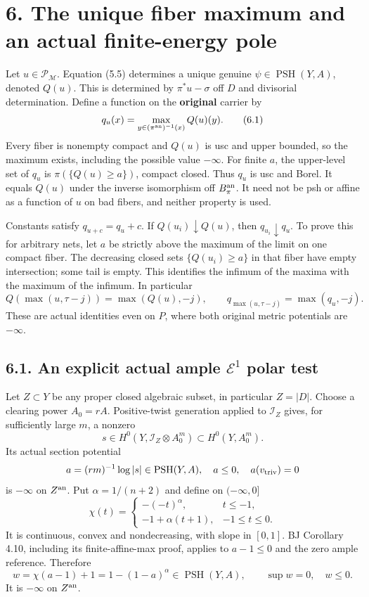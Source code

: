 \documentclass[
  10pt,
]{article}
\begin{document}
\section{6. The unique fiber maximum and an actual finite-energy
pole}\label{the-unique-fiber-maximum-and-an-actual-finite-energy-pole}

Let \(u\in\mathcal P_{\mathcal M}\). Equation (5.5) determines a unique
genuine \(\psi\in\operatorname{PSH}(Y,A)\), denoted \(Q(u)\). This is
determined by \(\pi^*u-\sigma\) off \(D\) and divisorial determination.
Define a function on the \textbf{original} carrier by \[
 q_u(x)=\max_{y\in(\pi^{\rm an})^{-1}(x)}Q(u)(y).
 \tag{6.1}
\] Every fiber is nonempty compact and \(Q(u)\) is usc and upper
bounded, so the maximum exists, including the possible value
\(-\infty\). For finite \(a\), the upper-level set of \(q_u\) is
\(\pi(\{Q(u)\geq a\})\), compact closed. Thus \(q_u\) is usc and Borel.
It equals \(Q(u)\) under the inverse isomorphism off \(B_\pi^{\rm an}\).
It need not be psh or affine as a function of \(u\) on bad fibers, and
neither property is used.

Constants satisfy \(q_{u+c}=q_u+c\). If \(Q(u_i)\downarrow Q(u)\), then
\(q_{u_i}\downarrow q_u\). To prove this for arbitrary nets, let \(a\)
be strictly above the maximum of the limit on one compact fiber. The
decreasing closed sets \(\{Q(u_i)\geq a\}\) in that fiber have empty
intersection; some tail is empty. This identifies the infimum of the
maxima with the maximum of the infimum. In particular \[
 Q(\max(u,\tau-j))=\max(Q(u),-j),\qquad
 q_{\max(u,\tau-j)}=\max(q_u,-j).
 \tag{6.2}
\] These are actual identities even on \(P\), where both original metric
potentials are \(-\infty\).

\subsection{\texorpdfstring{6.1. An explicit actual ample
\(\mathcal E^1\) polar
test}{6.1. An explicit actual ample \textbackslash mathcal E\^{}1 polar test}}\label{an-explicit-actual-ample-mathcal-e1-polar-test}

Let \(Z\subset Y\) be any proper closed algebraic subset, in particular
\(Z=|D|\). Choose a clearing power \(A_0=rA\). Positive-twist generation
applied to \(\mathcal I_Z\) gives, for sufficiently large \(m\), a
nonzero \[
 s\in H^0(Y,\mathcal I_Z\otimes A_0^m)\subset H^0(Y,A_0^m).
\] Its actual section potential \[
 a=(rm)^{-1}\log|s|\in\operatorname{PSH}(Y,A),\quad a\leq0,\quad
 a(v_{\rm triv})=0
\] is \(-\infty\) on \(Z^{\rm an}\). Put \(\alpha=1/(n+2)\) and define
on \((-\infty,0]\) \[
 \chi(t)=
 \begin{cases}
 -(-t)^\alpha,&t\leq-1,\\
 -1+\alpha(t+1),&-1\leq t\leq0.
 \end{cases}
\] It is continuous, convex and nondecreasing, with slope in \([0,1]\).
BJ Corollary 4.10, including its finite-affine-max proof, applies to
\(a-1\leq0\) and the zero ample reference. Therefore \[
 w=\chi(a-1)+1=1-(1-a)^\alpha
 \in\operatorname{PSH}(Y,A),\qquad \sup w=0,\quad w\leq0.
 \tag{6.3}
\] It is \(-\infty\) on \(Z^{\rm an}\).
\end{document}
